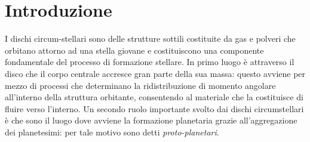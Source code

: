 \chapter{Introduzione}

I dischi circum-stellari sono delle strutture sottili costituite da gas e polveri che orbitano attorno ad una stella giovane e costituiscono una componente fondamentale del processo di formazione stellare. 
In primo luogo è attraverso il disco che il corpo centrale accresce gran parte della sua massa: questo avviene per mezzo di processi che determinano la ridistribuzione di momento angolare all'interno della struttura orbitante, consentendo al materiale che la costituisce di fluire verso l'interno.
Un secondo ruolo importante svolto dai dischi circumstellari è che sono il luogo dove avviene la formazione planetaria grazie all'aggregazione dei planetesimi: per tale motivo sono detti \textit{proto-planetari}.

